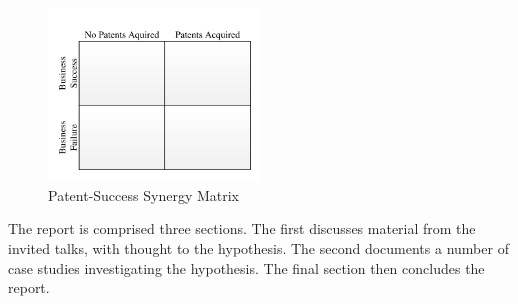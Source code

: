 \begin{figure}
\centering
\includegraphics[width=0.5\textwidth]{./Figures/SuccessMatrix.pdf}
\caption{Patent-Success Synergy Matrix} %
\label{fig:synergymatrix}
\end{figure}

The report is comprised three sections. 
The first discusses material from the invited talks, with thought to the hypothesis.
The second documents a number of case studies investigating the hypothesis.
The final section then concludes the report.
